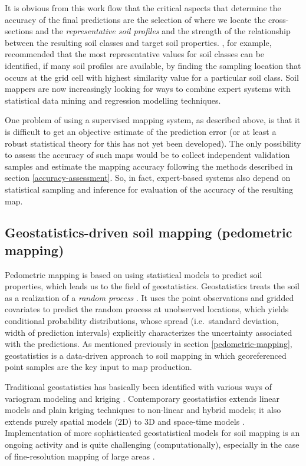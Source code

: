 \documentclass[11pt]{krantz}
\theoremstyle{definition}
\theoremstyle{definition}
\theoremstyle{definition}
\theoremstyle{remark}
\begin{document}
It is obvious from this work flow that the critical aspects that
determine the accuracy of the final predictions are the selection of
where we locate the cross-sections and the \emph{representative soil
profiles} and the strength of the relationship between the resulting
soil classes and target soil properties. \citet{Qi2006Geoderma}, for
example, recommended that the most representative values for soil
classes can be identified, if many soil profiles are available, by
finding the sampling location that occurs at the grid cell with highest
similarity value for a particular soil class. Soil mappers are now
increasingly looking for ways to combine expert systems with statistical
data mining and regression modelling techniques.

One problem of using a supervised mapping system, as described above, is
that it is difficult to get an objective estimate of the prediction
error (or at least a robust statistical theory for this has not yet been
developed). The only possibility to assess the accuracy of such maps
would be to collect independent validation samples and estimate the
mapping accuracy following the methods described in section
\ref{accuracy-assessment}. So, in fact, expert-based systems also depend
on statistical sampling and inference for evaluation of the accuracy of
the resulting map.

\hypertarget{regression-kriging}{%
\subsection{Geostatistics-driven soil mapping (pedometric
mapping)}\label{regression-kriging}}

Pedometric mapping is based on using statistical models to predict soil
properties, which leads us to the field of geostatistics. Geostatistics
treats the soil as a realization of a \emph{random process}
\citep{Webster2001Wiley}. It uses the point observations and gridded
covariates to predict the random process at unobserved locations, which
yields conditional probability distributions, whose spread
(i.e.~standard deviation, width of prediction intervals) explicitly
characterizes the uncertainty associated with the predictions. As
mentioned previously in section \ref{pedometric-mapping}, geostatistics
is a data-driven approach to soil mapping in which georeferenced point
samples are the key input to map production.

Traditional geostatistics has basically been identified with various
ways of variogram modeling and kriging \citep{Haining2010GEAN780}.
Contemporary geostatistics extends linear models and plain kriging
techniques to non-linear and hybrid models; it also extends purely
spatial models (2D) to 3D and space-time models
\citep{schabenberger2005statistical, Bivand2008Springer, Diggle2007Springer, cressie2011statistics}.
Implementation of more sophisticated geostatistical models for soil
mapping is an ongoing activity and is quite challenging
(computationally), especially in the case of fine-resolution mapping of
large areas \citep{Hengl2017SoilGrids250m}.
\end{document}
